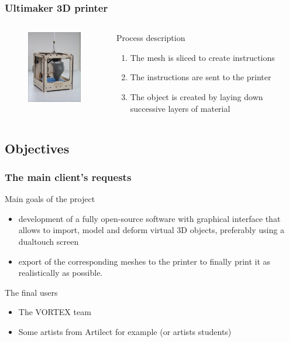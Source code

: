 \documentclass{beamer}
\begin{document}
\begin{frame}
	\frametitle{Ultimaker 3D printer}
	
	\begin{columns}[t]
  	\begin{column}{5cm}
  		\begin{figure}
		\includegraphics[width=4cm]{Ultimaker}	
		\end{figure}
  	\end{column}
  
  	\begin{column}{5cm}
  		\begin{block}{Process description}
  		\begin{enumerate}
  		\item The mesh is sliced to create instructions
  		\item The instructions are sent to the printer
  		\item The object is created by laying down successive layers of material
  		\end{enumerate}
 	 	\end{block}   
  	\end{column}
 	\end{columns}  
\end{frame}


\subsection{Objectives}
\begin{frame}
	\frametitle{The main client's requests}
	\begin{block}{Main goals of the project} 
	\begin{itemize}	
		\item development of a fully open-source software with graphical interface that allows to import, model and deform virtual 3D objects, preferably using a dualtouch screen
		\item export of the corresponding meshes to the printer to finally print it as realistically as possible.
	\end{itemize}
    \end{block}
    
    \begin{block}{The final users}
    	\begin{itemize}
		\item The \textsc{VORTEX} team
		\item Some artists from Artilect for example (or artists students)
		\end{itemize}
    \end{block}
    
\end{frame}
\end{document}

